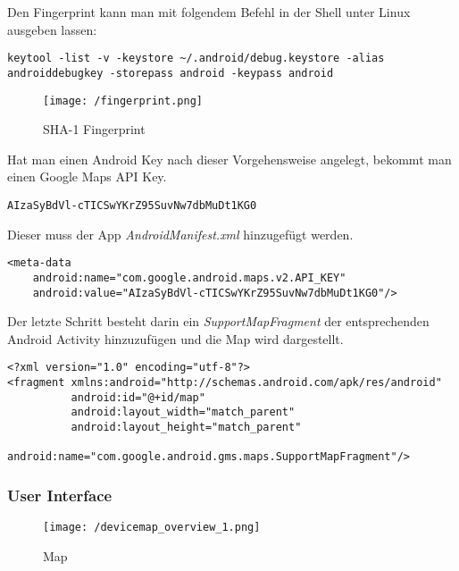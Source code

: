 Den Fingerprint kann man mit folgendem Befehl in der Shell unter Linux ausgeben lassen: 

\begin{lstlisting}[caption={Fingerprint Ausgabe},label=lst:FingerprintOutput]
keytool -list -v -keystore ~/.android/debug.keystore -alias androiddebugkey -storepass android -keypass android
\end{lstlisting}

\begin{figure}[H]
\centering
\texttt{[image: /fingerprint.png]}
\caption{SHA-1 Fingerprint}
\label{fig:fingerprint}
\end{figure}

Hat man einen Android Key nach dieser Vorgehensweise angelegt, bekommt man einen Google Maps API Key.

\begin{lstlisting}[caption={Google Map API Key},label=lst:MapApiKey]
AIzaSyBdVl-cTICSwYKrZ95SuvNw7dbMuDt1KG0
\end{lstlisting}

Dieser muss der App \textit{AndroidManifest.xml} hinzugefügt werden.

\begin{lstlisting}[caption={Google Map API Key hinzufügen},label=lst:MapApiKeyInsert]
<meta-data
    android:name="com.google.android.maps.v2.API_KEY"
    android:value="AIzaSyBdVl-cTICSwYKrZ95SuvNw7dbMuDt1KG0"/>
\end{lstlisting}

Der letzte Schritt besteht darin ein \textit{SupportMapFragment} der entsprechenden Android Activity hinzuzufügen und die Map wird dargestellt.

\begin{lstlisting}[caption={SupportMapFragment hinzufügen},label=lst:SupportMapFragmentInsert]
<?xml version="1.0" encoding="utf-8"?>
<fragment xmlns:android="http://schemas.android.com/apk/res/android"
          android:id="@+id/map"
          android:layout_width="match_parent"
          android:layout_height="match_parent"
          android:name="com.google.android.gms.maps.SupportMapFragment"/>
\end{lstlisting}
\newpage
\subsubsection{User Interface}

\begin{wrapfigure}{r}{40mm}
\vspace{-5mm}
\texttt{[image: /devicemap\_overview\_1.png]}
\vspace{-10mm}
\caption[User Interface: Device Map]{Map}
\vspace{-10mm}
\end{wrapfigure}

